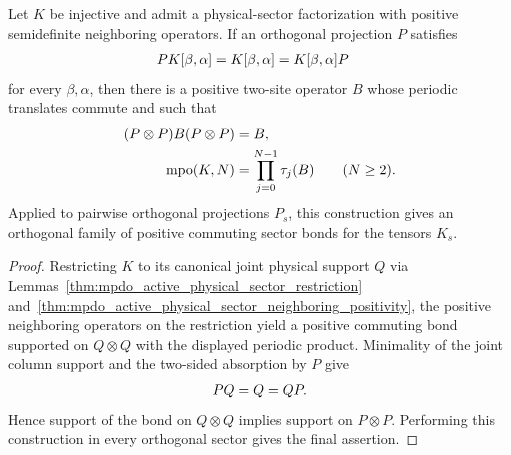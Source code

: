 \begin{lemma}
    \label{thm:mpdo_ambient_sector_factorization_supported_bond}
    \leanok
    Let $K$ be injective and admit a physical-sector factorization with
    positive semidefinite neighboring operators.  If an orthogonal projection
    $P$ satisfies
    \begin{align}
        PK[\beta,\alpha]
         & =K[\beta,\alpha]
        =K[\beta,\alpha]P
        \notag
    \end{align}
    for every $\beta,\alpha$, then there is a positive two-site operator $B$
    whose periodic translates commute and such that
    \begin{align}
        (P\otimes P)B(P\otimes P) & =B,
        \notag                                                  \\
        \operatorname{mpo}(K,N)
                                  & =\prod_{j=0}^{N-1}\tau_j(B)
        \qquad (N\geq2).
        \notag
    \end{align}
    Applied to pairwise orthogonal projections $P_s$, this construction gives
    an orthogonal family of positive commuting sector bonds for the tensors
    $K_s$.
\end{lemma}

\begin{proof}
    \leanok
    Restricting $K$ to its canonical joint physical support $Q$ via
    Lemmas~\ref{thm:mpdo_active_physical_sector_restriction}
    and~\ref{thm:mpdo_active_physical_sector_neighboring_positivity},
    the positive neighboring operators on the restriction yield a positive
    commuting bond supported on $Q\otimes Q$ with the displayed periodic
    product.  Minimality of the joint column support and the two-sided
    absorption by $P$ give
    \begin{align}
        PQ=Q=QP.
        \notag
    \end{align}
    Hence support of the bond on $Q\otimes Q$ implies support on
    $P\otimes P$.  Performing this construction in every orthogonal sector
    gives the final assertion.
\end{proof}

